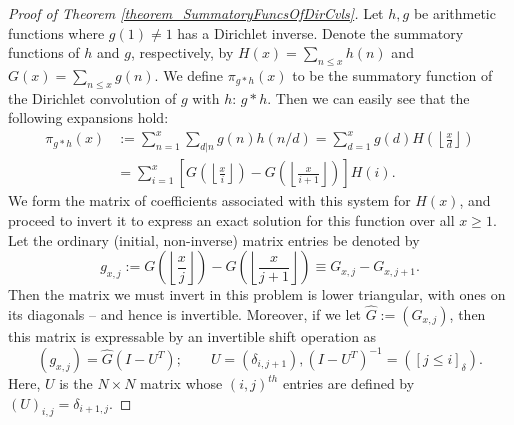 \documentclass[11pt,reqno,a4letter]{article}
\numberwithin{figure}{section}
\numberwithin{table}{section}
\newcommand{\Iverson}[1]{\ensuremath{\left[#1\right]_{\delta}}}
\newcommand{\floor}[1]{\left\lfloor #1 \right\rfloor}
\theoremstyle{plain}
\numberwithin{theorem}{section}
\theoremstyle{definition}
\begin{document}
\begin{proof}[Proof of Theorem \ref{theorem_SummatoryFuncsOfDirCvls}]
Let $h,g$ be arithmetic functions where $g(1) \neq 1$ has a Dirichlet inverse. Denote the summatory functions of $h$ and $g$, 
respectively, by $H(x) = \sum_{n \leq x} h(n)$ and $G(x) = \sum_{n \leq x} g(n)$. 
We define $\pi_{g \ast h}(x)$ to be the summatory function of the 
Dirichlet convolution of $g$ with $h$: $g \ast h$. 
Then we can easily see that the following expansions hold: 
\begin{align*} 
\pi_{g \ast h}(x) & := \sum_{n=1}^{x} \sum_{d|n} g(n) h(n/d) = \sum_{d=1}^x g(d) H\left(\floor{\frac{x}{d}}\right) \\ 
     & = \sum_{i=1}^x \left[G\left(\floor{\frac{x}{i}}\right) - G\left(\floor{\frac{x}{i+1}}\right)\right] H(i). 
\end{align*} 
We form the matrix of coefficients associated with this system for $H(x)$, and proceed to invert it to express an 
exact solution for this function over all $x \geq 1$. Let the ordinary (initial, non-inverse) matrix entries be denoted by 
\[
g_{x,j} := G\left(\floor{\frac{x}{j}}\right) - G\left(\floor{\frac{x}{j+1}}\right) \equiv G_{x,j} - G_{x,j+1}. 
\]
Then the matrix we must invert in this problem is lower triangular, with ones on its diagonals -- and hence is invertible. 
Moreover, if we let $\hat{G} := (G_{x,j})$, then this matrix is 
expressable by an invertible shift operation as 
\[
(g_{x,j}) = \hat{G} (I - U^{T}); \qquad U = (\delta_{i,j+1}), (I - U^T)^{-1} = (\Iverson{j \leq i}). 
\]
Here, $U$ is the $N \times N$ matrix whose $(i,j)^{th}$ entries are defined by 
$(U)_{i,j} = \delta_{i+1,j}$. 


\end{proof}
\end{document}
